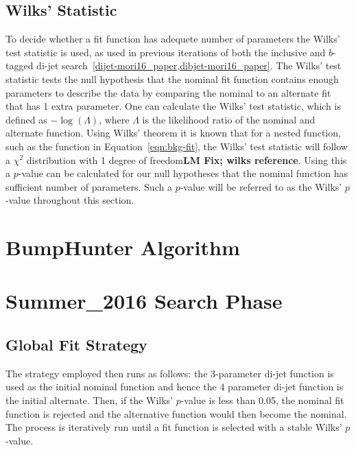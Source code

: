 \subsection{Wilks' Statistic}
\label{sec:bkg-bkg_wilks}

To decide whether a fit function has adequete number of parameters the Wilks' test statistic is used,
as used in previous iterations of both the inclusive and $b$-tagged di-jet search~\ref{dijet-mori16_paper,dibjet-mori16_paper}.
The Wilks' test statistic tests the null hypothesis that the nominal fit function contains enough parameters to describe the data
by  comparing the nominal to an alternate fit that has 1 extra parameter.
One can calculate the Wilks' test statistic, which is defined as $-\log{(\Lambda)}$, where $\Lambda$ is the likelihood ratio of the nominal and alternate function.
Using Wilks' theorem it is known that for a nested function, such as the function in Equation~\ref{eqn:bkg-fit},
the Wilks' test statistic will follow a $\chi^2$ distribution with 1 degree of freedom\textbf{LM Fix; wilks reference}.
Using this a $p$-value can be calculated for our null hypotheses that the nominal function has sufficient number of parameters.
Such a $p$-value will be referred to as the Wilks' $p$-value throughout this section.


\section{BumpHunter Algorithm}
\label{sec:bkg-bh}

\section{Summer\_2016 Search Phase}
\label{sec:bkg-summer}

\subsection{Global Fit Strategy}
\label{sec:bkg-summer_global}

The strategy employed then runs as follows:
the 3-parameter di-jet function is used as the initial nominal function and hence the 4 parameter di-jet function is the initial alternate.
Then, if the Wilks' $p$-value is less than 0.05, the nominal fit function is rejected and the alternative function would then become the nominal.
The process is iteratively run until a fit function is selected with a stable Wilks' $p$-value.

